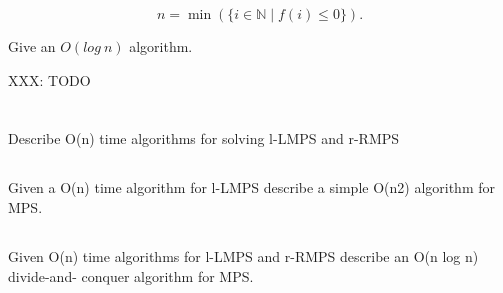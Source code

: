 \documentclass{amsart}
\theoremstyle{definition}
\theoremstyle{remark}
\numberwithin{equation}{section}
\newcommand{\NN}{\mathbb N}
\begin{document}
$$ n = \min (\{i \in \NN \mid f(i) \leq 0 \}).$$ 

Give an $O(log\ n)$ algorithm.

\alg

XXX: TODO

\section{}

\subsection{} Describe O(n) time algorithms for solving l-LMPS and r-RMPS

\subsection{} Given a O(n) time algorithm for l-LMPS describe a simple O(n2) algorithm for MPS.

\subsection{} Given O(n) time algorithms for l-LMPS and r-RMPS describe an O(n log n) divide-and- conquer algorithm for MPS.
\end{document}
